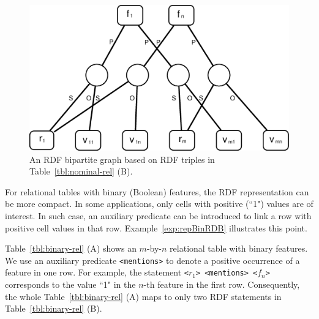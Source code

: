 \begin{figure}[tbh]
\begin{center}
\includegraphics[width=.5\textwidth]{fig/BG-relational-nominal.eps}
\end{center}
\caption[The RDF bipartite graph for a nominal-valued table]{\label{fig:BG-relational-nominal} An RDF bipartite graph based on RDF triples in Table~\ref{tbl:nominal-rel} (B).}
\end{figure}

For relational tables with binary (Boolean) features, the RDF representation can be more compact. In some applications, only cells with positive (``1") values are of interest. In such case, an auxiliary predicate can be introduced to link a row with positive cell values in that row. Example~\ref{exp:repBinRDB} illustrates this point.

\begin{myexp}
\label{exp:repBinRDB}
Table~\ref{tbl:binary-rel} (A) shows an $m$-by-$n$ relational table with binary features. We use an auxiliary predicate \texttt{<mentions>} to denote a positive occurrence of a feature in one row. For example, the statement \texttt{<$r_1$> <mentions> <$f_n$>} corresponds to the value ``1" in the $n$-th feature in the first row. Consequently, the whole Table~\ref{tbl:binary-rel} (A) maps to only two RDF statements in Table~\ref{tbl:binary-rel} (B).
\end{myexp}


